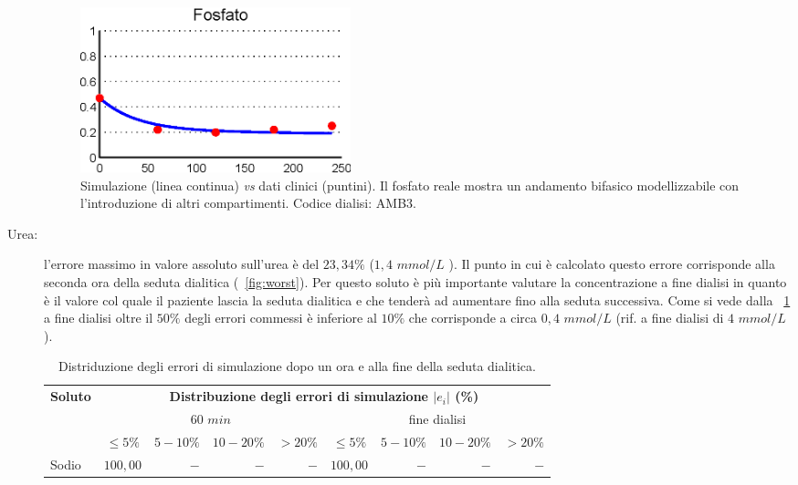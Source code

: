 \begin{description}
\begin{figure}[!h]
	\centering
	\includegraphics[width=0.4\textwidth]{immagini/fosAMB3.eps}
	\caption{Simulazione (linea continua) \textit{vs} dati clinici (puntini). Il fosfato reale mostra un andamento bifasico modellizzabile con l'introduzione di altri compartimenti. Codice dialisi: AMB3.}\label{fig:real_fos}
\end{figure}
	\item[Urea:] l'errore massimo in valore assoluto sull'urea è del $23,34\%$ ($1,4$ $mmol/L$ ). Il punto in cui è calcolato questo errore corrisponde alla seconda ora della seduta dialitica (\figurename~\ref{fig:worst}). Per questo soluto è più importante valutare la concentrazione a fine dialisi in quanto è il valore col quale il paziente lascia la seduta dialitica e che tenderà ad aumentare fino alla seduta successiva. Come si vede dalla \tablename~\ref{tab:distrib} a fine dialisi oltre il $50\%$ degli errori commessi è inferiore al $10\%$ che corrisponde a circa $0,4$ $mmol/L$ (rif. a fine dialisi di $4$ $mmol/L$).
\begin{table}[!t]
	\centering
	\caption{Distriduzione degli errori di simulazione dopo un ora e alla fine della seduta dialitica.}\label{tab:distrib}
	\begin{tabular}{lrrrrrrrr}
	\toprule 
		\textbf{Soluto}   &  \multicolumn{8}{c}{\textbf{Distribuzione degli errori di simulazione $|e_i|$ (\%)}}  \\
		\cmidrule(lr){2-9}
				              &        \multicolumn{4}{c}{$60$ $min$}          &       \multicolumn{4}{c}{fine dialisi}             \\
		                  & \multicolumn{1}{c}{\scriptsize$\leq 5\%$}      & \multicolumn{1}{c}{\scriptsize$5-10\%$}   & \multicolumn{1}{c}{\scriptsize$10-20\%$}  & \multicolumn{1}{c}{\scriptsize$>20\%$}     & \multicolumn{1}{c}{\scriptsize$\leq 5\%$}      & \multicolumn{1}{c}{\scriptsize$5-10\%$}   & \multicolumn{1}{c}{\scriptsize$10-20\%$}   & \multicolumn{1}{c}{\scriptsize$>20\%$}  \\
    \cmidrule(lr){2-5}\cmidrule(lr){6-9}
    Sodio          & $100,00$ & $-$     & $-$     & $-$     & $100,00$ & $-$     & $-$     & $-$ \\

\end{tabular}
\end{table}
\end{description}
